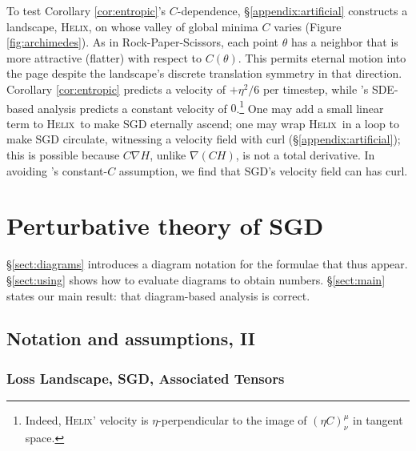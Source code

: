\documentclass[anon,12pt]{colt2021} %
\newcommand{\Helix}{\textsc{Helix}}
\begin{document}
            To test Corollary \ref{cor:entropic}'s $C$-dependence,
            \S\ref{appendix:artificial} constructs a landscape, \Helix, on
            whose valley of global minima $C$ varies (Figure
            \ref{fig:archimedes}).  As in Rock-Paper-Scissors, each point
            $\theta$ has a neighbor that is more attractive (flatter) with
            respect to $C(\theta)$.  This permits eternal motion into the page
            despite the landscape's discrete translation symmetry in that
            direction.  Corollary \ref{cor:entropic} predicts a velocity of
            $+\eta^2/6$ per timestep, while \cite{ch18}'s SDE-based analysis
            predicts a constant velocity of $0$.\footnote{
                Indeed, \Helix' velocity is $\eta$-perpendicular to the image
                of $(\eta C)^\mu_\nu$ in tangent space.
            }
            One may add a small linear term to \Helix\ to make SGD eternally
            ascend; one may wrap \Helix\ in a loop to make SGD circulate,
            witnessing a velocity field with curl (\S\ref{appendix:artificial});
            this is
            possible because $C\nabla H$, unlike $\nabla(CH)$, is not a total
            derivative. 
            In avoiding \cite{we19b}'s constant-$C$ assumption, we 
            find that SGD's velocity field can has curl. 
            
    \section{Perturbative theory of SGD}\label{sect:calculus}

        \S\ref{sect:diagrams} introduces a diagram
        notation for the formulae that thus appear.  \S\ref{sect:using} shows
        how to evaluate diagrams to obtain numbers.  \S\ref{sect:main} states
        our main result: that diagram-based analysis is correct.

        \subsection{Notation and assumptions, II}\label{sect:background}


            \subsubsection{Loss Landscape, SGD, Associated Tensors}
\end{document}
